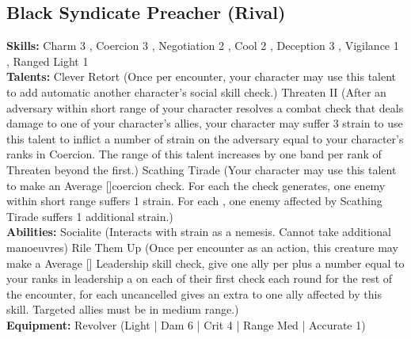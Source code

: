 \documentclass{article}
\newcommand\Average{Average [\Purple[2]]}
\begin{document}
\begin{multicols}{2}
{\subsection{Black Syndicate Preacher (Rival)}
\begin{center}
\end{center}
\textbf{Skills:}
Charm 3 \Yellow[3]\Green[1],
Coercion 3 \Yellow[3]\Green[1],
Negotiation 2 \Yellow[2]\Green[2],
Cool 2 \Yellow[2]\Green[1],
Deception 3 \Yellow[3],
Vigilance 1 \Yellow[1]\Green[2],
Ranged Light 1 \Yellow[1]\Green[1]
\\\textbf{Talents:}
Clever Retort (Once per encounter, your character may use this talent to add automatic \Threat\Threat another character’s social skill check.) 
Threaten II (After an adversary within short range of your character resolves a combat check that deals damage to one of your character’s allies, your character may suffer 3 strain to use this talent to inflict a number of strain on the adversary equal to your character’s ranks in Coercion. The range of this talent increases by one band per rank of Threaten beyond the first.) 
Scathing Tirade (Your character may use this talent to make an \Average coercion check. For each \Success the check generates, one enemy within short range suffers 1 strain. For each \Advantage, one enemy affected by Scathing Tirade suffers 1 additional strain.)
\\\textbf{Abilities:}
Socialite (Interacts with strain as a nemesis. Cannot take additional manoeuvres)
Rile Them Up (Once per encounter as an action, this creature may make a \Average{} Leadership skill check, give one ally per \Success plus a number equal to your ranks in leadership a \Boost on each of their first check each round for the rest of the encounter, for each uncancelled \Advantage gives an extra \Boost to one ally affected by this skill. Targeted allies must be in medium range.)
\\\textbf{Equipment:} Revolver (Light | Dam 6 | Crit 4 | Range Med | Accurate 1)
}

\vbox{
}
\end{multicols}
\end{document}
